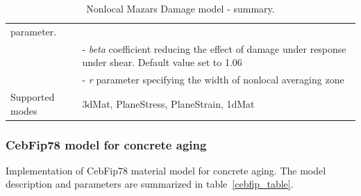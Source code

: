 \documentclass[epsf,a4paper]{article}
\newcommand{\param}[1]{{\it #1}}
\begin{document}
\begin{table}[h]
\begin{tabular}{|l|p{9cm}|}
parameter.\\
&- \param{beta} coefficient reducing the effect of damage under
response under shear. Default value set to 1.06\\
&- \param{r} parameter specifying the width of nonlocal averaging zone\\
Supported modes& 3dMat, PlaneStress, PlaneStrain, 1dMat\\
\hline
\end{tabular}                                                                   
\caption{Nonlocal Mazars Damage model  - summary.}                
\label{maznl_table}                                                         
\end{table}                                                                     



\subsubsection{CebFip78 model for concrete aging}
Implementation of CebFip78 material model for concrete aging.
The model description and parameters are summarized
in table~\ref{cebfip_table}.
\end{document}
